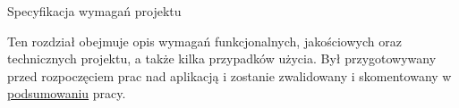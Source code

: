 \begin{chapter}{Specyfikacja wymagań projektu}
	\newcommand{\chapterPath}{rozdzialy/2_wymagania}
	
	Ten rozdział obejmuje opis wymagań funkcjonalnych, jakościowych oraz technicznych projektu, a także kilka przypadków użycia. Był przygotowywany przed rozpoczęciem prac nad aplikacją i zostanie zwalidowany i skomentowany w \hyperref[ch:podsumowanie]{podsumowaniu} pracy.

	
	
	
	
\end{chapter}
